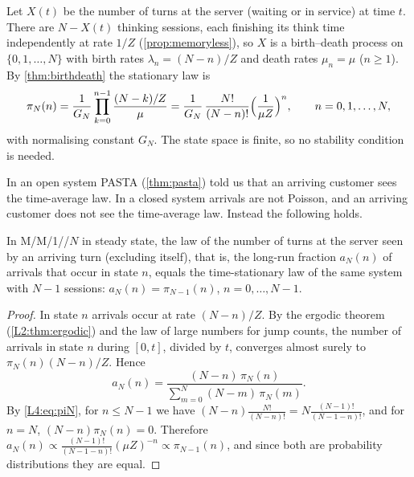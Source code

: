 
Let $X(t)$ be the number of turns at the server (waiting or in service) at time
$t$. There are $N-X(t)$ thinking sessions, each finishing its think time
independently at rate $1/Z$ (\cref{prop:memoryless}), so $X$ is a birth--death
process on $\{0,1,\dots,N\}$ with birth rates $\lambda_n=(N-n)/Z$ and death
rates $\mu_n=\mu$ ($n\ge1$). By \cref{thm:birthdeath} the stationary law is
\begin{equation}\label{L4:eq:piN}
  \pi_N(n)=\frac{1}{G_N}\prod_{k=0}^{n-1}\frac{(N-k)/Z}{\mu}
  =\frac{1}{G_N}\,\frac{N!}{(N-n)!}\Bigl(\frac{1}{\mu Z}\Bigr)^{n},
  \qquad n=0,1,\dots,N,
\end{equation}
with normalising constant $G_N$. The state space is finite, so no stability
condition is needed.

In an open system PASTA (\cref{thm:pasta}) told us that an arriving customer sees
the time-average law. In a closed system arrivals are not Poisson, and an
arriving customer does not see the time-average law. Instead the following
holds.

\begin{theorem}\label{thm:arrival}
In M/M/1//$N$ in steady state, the law of the number of turns at the server seen
by an arriving turn (excluding itself), that is, the long-run fraction $a_N(n)$
of arrivals that occur in state $n$, equals the time-stationary law of the same
system with $N-1$ sessions: $a_N(n)=\pi_{N-1}(n)$, $n=0,\dots,N-1$.
\end{theorem}

\begin{proof}
In state $n$ arrivals occur at rate $(N-n)/Z$. By the ergodic theorem
(\cref{L2:thm:ergodic}) and the law of large numbers for jump counts, the number of
arrivals in state $n$ during $[0,t]$, divided by $t$, converges almost surely to
$\pi_N(n)(N-n)/Z$. Hence
\[
  a_N(n)=\frac{(N-n)\,\pi_N(n)}{\sum_{m=0}^{N}(N-m)\,\pi_N(m)} .
\]
By \eqref{L4:eq:piN}, for $n\le N-1$ we have
$(N-n)\frac{N!}{(N-n)!}=N\frac{(N-1)!}{(N-1-n)!}$, and for $n=N$,
$(N-n)\pi_N(n)=0$. Therefore
$a_N(n)\propto\frac{(N-1)!}{(N-1-n)!}(\mu Z)^{-n}\propto\pi_{N-1}(n)$, and since
both are probability distributions they are equal.
\end{proof}

